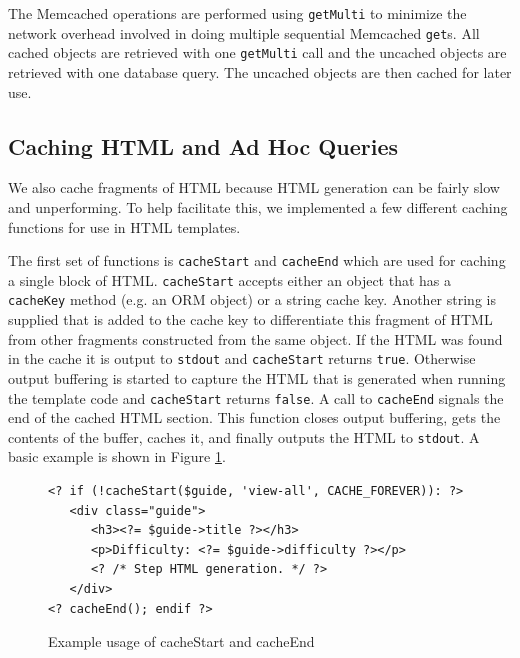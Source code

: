 \documentclass[12pt]{ucthesis}
\begin{document}
The \textsf{Memcached} operations are performed using {\tt getMulti} to minimize the network overhead involved in doing multiple sequential \textsf{Memcached} {\tt get}s.
All cached objects are retrieved with one {\tt getMulti} call and the uncached objects are retrieved with one database query.
The uncached objects are then cached for later use.

\subsection{Caching HTML and Ad Hoc Queries}
We also cache fragments of HTML because HTML generation can be fairly slow and unperforming.
To help facilitate this, we implemented a few different caching functions for use in HTML templates.

The first set of functions is {\tt cacheStart} and {\tt cacheEnd} which are used for caching a single block of HTML.
{\tt cacheStart} accepts either an object that has a {\tt cacheKey} method (e.g. an ORM object) or a string cache key.
Another string is supplied that is added to the cache key to differentiate this fragment of HTML from other fragments constructed from the same object.
If the HTML was found in the cache it is output to {\tt stdout} and {\tt cacheStart} returns {\tt true}.
Otherwise output buffering is started to capture the HTML that is generated when running the template code and {\tt cacheStart} returns {\tt false}.
A call to {\tt cacheEnd} signals the end of the cached HTML section.
This function closes output buffering, gets the contents of the buffer, caches it, and finally outputs the HTML to {\tt stdout}.
A basic example is shown in Figure \ref{fig:cacheStartExample}.

\begin{figure}[h]
\begin{ssp}
\begin{verbatim}
<? if (!cacheStart($guide, 'view-all', CACHE_FOREVER)): ?>
   <div class="guide">
      <h3><?= $guide->title ?></h3>
      <p>Difficulty: <?= $guide->difficulty ?></p>
      <? /* Step HTML generation. */ ?>
   </div>
<? cacheEnd(); endif ?>
\end{verbatim}
\end{ssp}
\caption{Example usage of cacheStart and cacheEnd}
\label{fig:cacheStartExample}
\end{figure}
\end{document}
